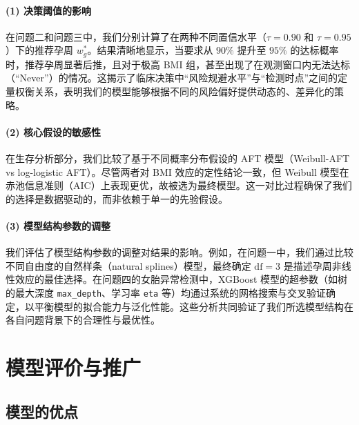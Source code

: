 \documentclass[withoutpreface]{cumcmthesis}
\begin{document}
\paragraph{(1) 决策阈值的影响} 在问题二和问题三中，我们分别计算了在两种不同置信水平（$\tau=0.90$ 和 $\tau=0.95$）下的推荐孕周 $w_g^*$。结果清晰地显示，当要求从 $90\%$ 提升至 $95\%$ 的达标概率时，推荐孕周显著后推，且对于极高 BMI 组，甚至出现了在观测窗口内无法达标（“Never”）的情况。这揭示了临床决策中“风险规避水平”与“检测时点”之间的定量权衡关系，表明我们的模型能够根据不同的风险偏好提供动态的、差异化的策略。

\paragraph{(2) 核心假设的敏感性} 在生存分析部分，我们比较了基于不同概率分布假设的 AFT 模型（Weibull-AFT vs log-logistic AFT）。尽管两者对 BMI 效应的定性结论一致，但 Weibull 模型在赤池信息准则（AIC）上表现更优，故被选为最终模型。这一对比过程确保了我们的选择是数据驱动的，而非依赖于单一的先验假设。

\paragraph{(3) 模型结构参数的调整} 我们评估了模型结构参数的调整对结果的影响。例如，在问题一中，我们通过比较不同自由度的自然样条（natural splines）模型，最终确定 $\mathrm{df}=3$ 是描述孕周非线性效应的最佳选择。在问题四的女胎异常检测中，XGBoost 模型的超参数（如树的最大深度 \texttt{max\_depth}、学习率 \texttt{eta} 等）均通过系统的网格搜索与交叉验证确定，以平衡模型的拟合能力与泛化性能。这些分析共同验证了我们所选模型结构在各自问题背景下的合理性与最优性。

\section{模型评价与推广}

\subsection{模型的优点}
\end{document}
